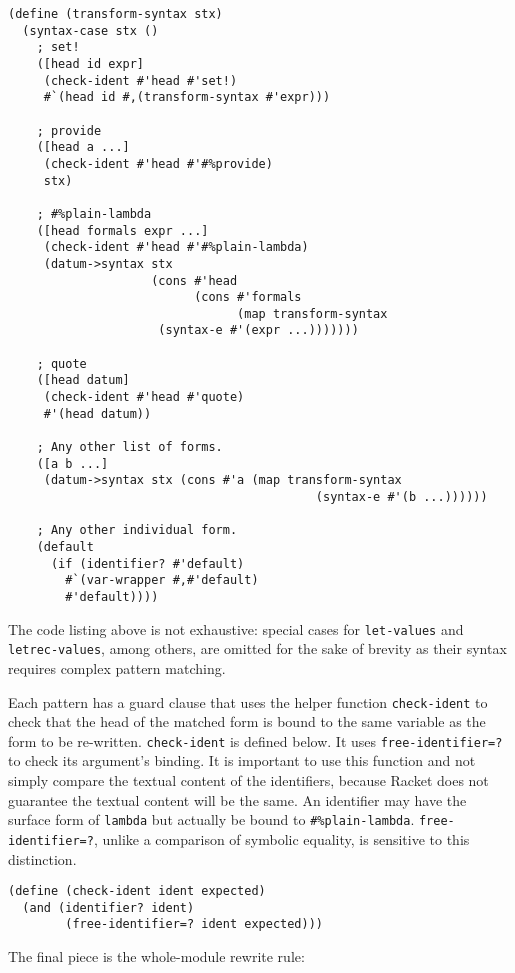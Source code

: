 \documentclass{article}
\begin{document}
\begin{lstlisting}
(define (transform-syntax stx)
  (syntax-case stx ()
    ; set!
    ([head id expr]
     (check-ident #'head #'set!)
     #`(head id #,(transform-syntax #'expr)))

    ; provide
    ([head a ...]
     (check-ident #'head #'#%provide)
     stx)

    ; #%plain-lambda
    ([head formals expr ...]
     (check-ident #'head #'#%plain-lambda)
     (datum->syntax stx
                    (cons #'head
                          (cons #'formals
                                (map transform-syntax
				     (syntax-e #'(expr ...)))))))

    ; quote
    ([head datum]
     (check-ident #'head #'quote)
     #'(head datum))

    ; Any other list of forms.
    ([a b ...]
     (datum->syntax stx (cons #'a (map transform-syntax
                                           (syntax-e #'(b ...))))))

    ; Any other individual form.
    (default
      (if (identifier? #'default)
        #`(var-wrapper #,#'default)
        #'default))))
\end{lstlisting}

The code listing above is not exhaustive: special cases for \texttt{let-values} and \texttt{letrec-values}, among others, are omitted for the sake of brevity as their syntax requires complex pattern matching.

Each pattern has a guard clause that uses the helper function \texttt{check-ident} to check that the head of the matched form is bound to the same variable as the form to be re-written. \texttt{check-ident} is defined below. It uses \texttt{free-identifier=?} to check its argument's binding. It is important to use this function and not simply compare the textual content of the identifiers, because Racket does not guarantee the textual content will be the same. An identifier may have the surface form of \texttt{lambda} but actually be bound to \texttt{\#\%plain-lambda}. \texttt{free-identifier=?}, unlike a comparison of symbolic equality, is sensitive to this distinction.

\begin{lstlisting}
(define (check-ident ident expected)
  (and (identifier? ident)
        (free-identifier=? ident expected)))
\end{lstlisting}

The final piece is the whole-module rewrite rule:
\end{document}
